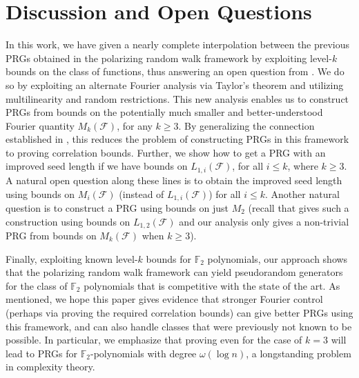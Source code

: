 \section{Discussion and Open Questions}
In this work, we have given a nearly complete interpolation between the previous PRGs obtained in the polarizing random walk framework by exploiting level-$k$ bounds on the class of functions, thus answering an open question from \cite{CHLT}. We do so by exploiting an alternate Fourier analysis via Taylor's theorem and utilizing multilinearity and random restrictions. This new analysis enables us to  construct PRGs from bounds on the potentially much smaller and better-understood Fourier quantity $M_k(\mathcal{F})$, for any $k \ge 3$. By generalizing the connection established in \cite{xorlemma}, this reduces the problem of constructing PRGs in this framework to proving correlation bounds. Further, we show how to get a PRG with an improved seed length if we have bounds on $L_{1,i}(\mathcal{F})$, for all $i \le k$, where $k\ge 3$. A natural open question along these lines is to obtain the improved seed length using bounds on $M_i(\mathcal{F})$ (instead of $L_{1,i}(\mathcal{F})$) for all $i \le k$. Another natural question is to construct a PRG using bounds on just $M_2$ (recall that \cite{CHLT} gives such a construction using bounds on $L_{1,2}(\mathcal{F})$ and our analysis only gives a non-trivial PRG from bounds on $M_k(\mathcal{F})$ when $k \ge 3$).

Finally, exploiting known level-$k$ bounds for $\mathbb{F}_2$ polynomials, our approach shows that the polarizing random walk framework can yield  pseudorandom generators for the class of $\mathbb{F}_2$ polynomials that is competitive with the state of the art.  As mentioned, we hope this paper gives evidence that stronger Fourier control (perhaps via proving the required correlation bounds) can give better PRGs using this framework, and can also handle classes that were previously not known to be possible.  In particular, we emphasize that proving  even for the case of $k=3$ will lead to PRGs for $\mathbb{F}_2$-polynomials with degree $\omega(\log n)$, a longstanding problem in complexity theory. 








